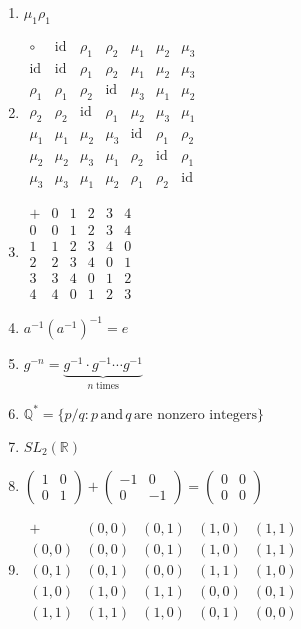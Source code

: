 \documentclass[oneside,10pt,]{article}
\newcommand{\identity}{\mathrm{id}}
\begin{document}
\begin{enumerate}
\item{}\(\displaystyle \mu_1 \rho_1\)%
\item{}\(\displaystyle \begin{array}{c|cccccc} \circ & \identity & \rho_1 & \rho_2 & \mu_1 & \mu_2 & \mu_3 \\ \hline \identity & \identity & \rho_1 & \rho_2 & \mu_1 & \mu_2 & \mu_3 \\ \rho_1 & \rho_1 & \rho_2 & \identity & \mu_3 & \mu_1 & \mu_2 \\ \rho_2 & \rho_2 & \identity & \rho_1 & \mu_2 & \mu_3 & \mu_1 \\ \mu_1 & \mu_1 & \mu_2 & \mu_3 & \identity & \rho_1& \rho_2\\ \mu_2 & \mu_2 & \mu_3 & \mu_1 & \rho_2 & \identity & \rho_1\\ \mu_3 & \mu_3 & \mu_1 & \mu_2 & \rho_1 & \rho_2& \identity \end{array}\)%
\item{}\(\displaystyle \begin{array}{c|ccccc} + & 0 & 1 & 2 & 3 & 4 \\ \hline 0 & 0 & 1 & 2 & 3 & 4 \\ 1 & 1 & 2 & 3 & 4 & 0 \\ 2 & 2 & 3 & 4 & 0 & 1 \\ 3 & 3 & 4 & 0 & 1 & 2 \\ 4 & 4 & 0 & 1 & 2 & 3 \end{array}\)%
\item{}\(\displaystyle a^{-1} (a^{-1})^{-1} = e\)%
\item{}\(\displaystyle g^{-n} = \underbrace{g^{-1} \cdot g^{-1} \cdots g^{-1}}_{n \; \text{times}}\)%
\item{}\(\displaystyle {\mathbb Q}^* = \{ p/q : p \, \text{and}\, q\, \text{are nonzero integers} \}\)%
\item{}\(\displaystyle SL_2( {\mathbb R})\)%
\item{}\(\displaystyle \begin{pmatrix} 1 & 0 \\ 0 & 1 \end{pmatrix} + \begin{pmatrix} -1 & 0 \\ 0 & -1 \end{pmatrix} = \begin{pmatrix} 0 & 0 \\ 0 & 0 \end{pmatrix}\)%
\item{}\(\displaystyle \begin{array}{c|cccc} + & (0,0) & (0,1) & (1,0) & (1,1) \\ \hline (0,0) & (0,0) & (0,1) & (1,0) & (1,1) \\ (0,1) & (0,1) & (0,0) & (1,1) & (1,0) \\ (1,0) & (1,0) & (1,1) & (0,0) & (0,1) \\ (1,1) & (1,1) & (1,0) & (0,1) & (0,0) \end{array}\)%

\end{enumerate}
\end{document}
